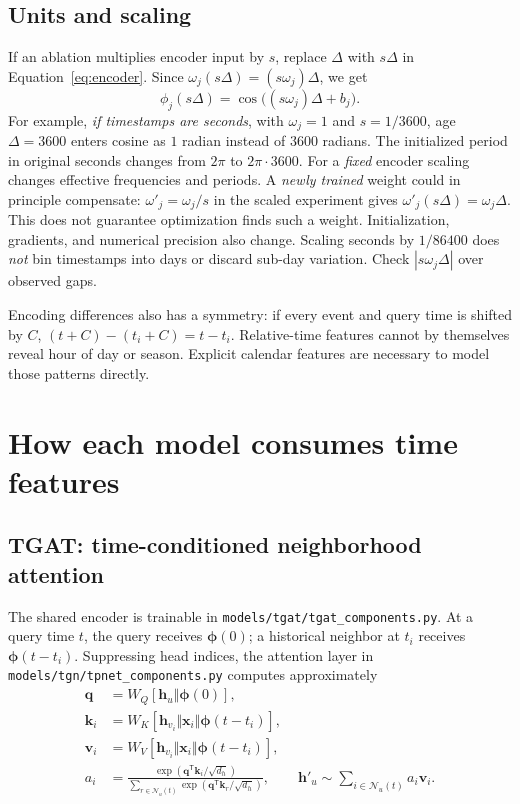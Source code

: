 \documentclass[11pt]{article}
\begin{document}
\subsection{Units and scaling}
If an ablation multiplies encoder input by $s$, replace $\Delta$ with $s\Delta$ in Equation~\eqref{eq:encoder}. Since $\omega_j(s\Delta)=(s\omega_j)\Delta$, we get
\begin{equation}\label{eq:scale}
\phi_j(s\Delta)=\cos\bigl((s\omega_j)\Delta+b_j\bigr).
\end{equation}
For example, \emph{if timestamps are seconds}, with $\omega_j=1$ and $s=1/3600$, age $\Delta=3600$ enters cosine as $1$ radian instead of $3600$ radians. The initialized period in original seconds changes from $2\pi$ to $2\pi\cdot3600$. For a \emph{fixed} encoder scaling changes effective frequencies and periods. A \emph{newly trained} weight could in principle compensate: $\omega'_j=\omega_j/s$ in the scaled experiment gives $\omega'_j(s\Delta)=\omega_j\Delta$. This does not guarantee optimization finds such a weight. Initialization, gradients, and numerical precision also change. Scaling seconds by $1/86400$ does \emph{not} bin timestamps into days or discard sub-day variation. Check $|s\omega_j\Delta|$ over observed gaps.

Encoding differences also has a symmetry: if every event and query time is shifted by $C$, $(t+C)-(t_i+C)=t-t_i$. Relative-time features cannot by themselves reveal hour of day or season. Explicit calendar features are necessary to model those patterns directly.

\section{How each model consumes time features}
\subsection{TGAT: time-conditioned neighborhood attention}
The shared encoder is trainable in \texttt{models/tgat/tgat\_components.py}. At a query time $t$, the query receives $\boldsymbol{\phi}(0)$; a historical neighbor at $t_i$ receives $\boldsymbol{\phi}(t-t_i)$. Suppressing head indices, the attention layer in \texttt{models/tgn/tpnet\_components.py} computes approximately
\begin{align}
\mathbf{q}&=W_Q[\mathbf{h}_u\Vert\boldsymbol{\phi}(0)],\\
\mathbf{k}_i&=W_K[\mathbf{h}_{v_i}\Vert\mathbf{x}_i\Vert\boldsymbol{\phi}(t-t_i)],\\
\mathbf{v}_i&=W_V[\mathbf{h}_{v_i}\Vert\mathbf{x}_i\Vert\boldsymbol{\phi}(t-t_i)],\\
a_i&=\frac{\exp(\mathbf{q}^{\mathsf T}\mathbf{k}_i/\sqrt{d_h})}
{\sum_{r\in\mathcal N_u(t)}\exp(\mathbf{q}^{\mathsf T}\mathbf{k}_r/\sqrt{d_h})},
\qquad \mathbf{h}'_u\sim\sum_{i\in\mathcal N_u(t)}a_i\mathbf{v}_i.
\end{align}
\end{document}
